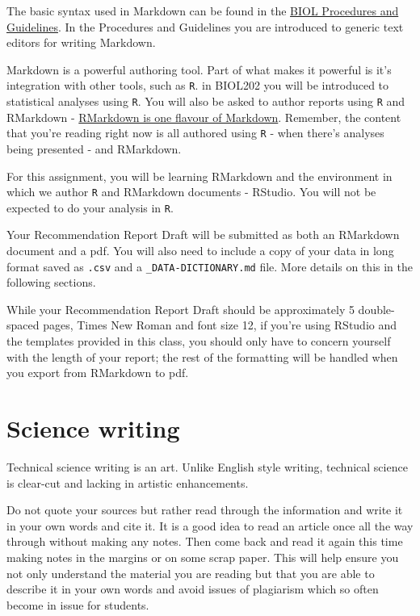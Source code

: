 \documentclass[
]{book}
\begin{document}
The basic syntax used in Markdown can be found in the \href{https://ubco-biology.github.io/Procedures-and-Guidelines/markdown-1.html}{BIOL Procedures and Guidelines}. In the Procedures and Guidelines you are introduced to generic text editors for writing Markdown.

Markdown is a powerful authoring tool. Part of what makes it powerful is it's integration with other tools, such as \texttt{R}. in BIOL202 you will be introduced to statistical analyses using \texttt{R}. You will also be asked to author reports using \texttt{R} and RMarkdown - \href{https://ubco-biology.github.io/Procedures-and-Guidelines/markdown-flavours.html}{RMarkdown is one flavour of Markdown}. Remember, the content that you're reading right now is all authored using \texttt{R} - when there's analyses being presented - and RMarkdown.

For this assignment, you will be learning RMarkdown and the environment in which we author \texttt{R} and RMarkdown documents - RStudio. You will not be expected to do your analysis in \texttt{R}.

Your Recommendation Report Draft will be submitted as both an RMarkdown document and a pdf. You will also need to include a copy of your data in long format saved as \texttt{.csv} and a \texttt{\_DATA-DICTIONARY.md} file. More details on this in the following sections.

While your Recommendation Report Draft should be approximately 5 double-spaced pages, Times New Roman and font size 12, if you're using RStudio and the templates provided in this class, you should only have to concern yourself with the length of your report; the rest of the formatting will be handled when you export from RMarkdown to pdf.

\hypertarget{science-writing}{%
\section*{Science writing}\label{science-writing}}

Technical science writing is an art. Unlike English style writing, technical science is clear-cut and lacking in artistic enhancements.

Do not quote your sources but rather read through the information and write it in your own words and cite it. It is a good idea to read an article once all the way through without making any notes. Then come back and read it again this time making notes in the margins or on some scrap paper. This will help ensure you not only understand the material you are reading but that you are able to describe it in your own words and avoid issues of plagiarism which so often become in issue for students.
\end{document}

